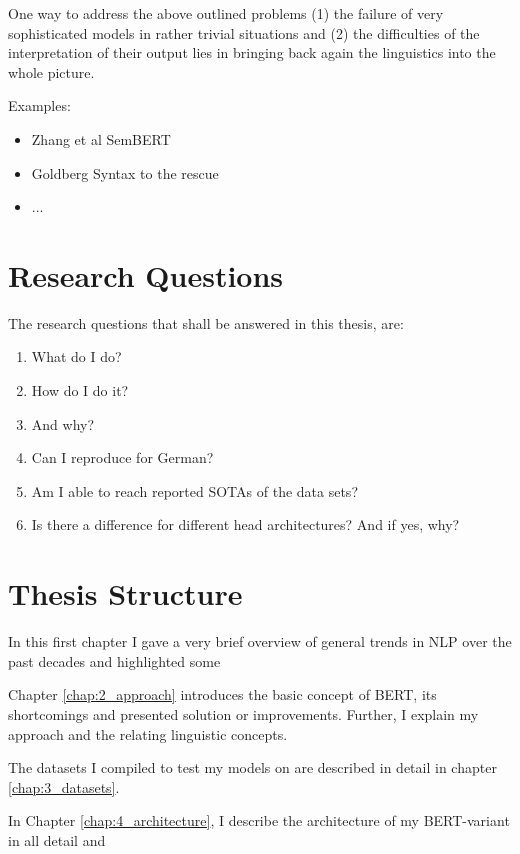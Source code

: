One way to address the above outlined problems (1) the failure of very sophisticated models
in rather trivial situations and (2) the difficulties of the interpretation of their output
lies in bringing back again the linguistics into the whole picture.

Examples:

\begin{itemize}
	\item Zhang et al SemBERT
	\item Goldberg Syntax to the rescue
	\item ...
\end{itemize}


\section{Research Questions}

The research questions that shall be answered in this thesis, are:
\begin{enumerate}
 \item What do I do?
 \item How do I do it?
 \item And why?
	\item Can I reproduce \cite{zhang2019semantics} for German?
	\item Am I able to reach reported SOTAs of the data sets?
	\item Is there a difference for different head architectures? And if yes, why?
\end{enumerate}

\section{Thesis Structure}
In this first chapter I gave a very brief overview of general trends in
NLP over the past decades and highlighted some

Chapter \ref{chap:2_approach} introduces the basic concept of BERT,
its {\color{red} shortcomings} and presented solution or improvements. Further,
I explain my approach and the relating linguistic concepts.

The datasets I compiled to test my models on are described in detail
in chapter \ref{chap:3_datasets}.

In Chapter \ref{chap:4_architecture}, I describe the architecture of my
BERT-variant in all detail and

